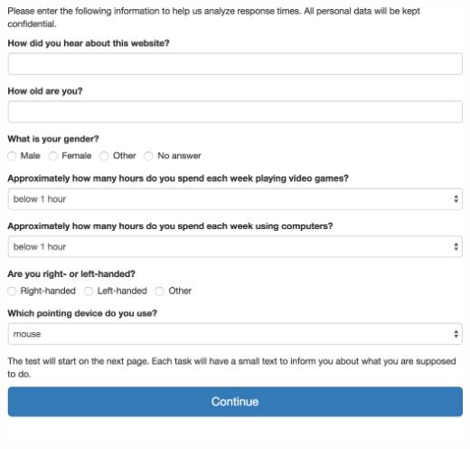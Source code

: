 \begin{appendices}
\begin{minipage}{\textwidth}
\centering
\includegraphics[width=\textwidth]{images/screenshots/ex_step_3_questions}
\label{fig:ex_step_3_questions}
\end{minipage}


\end{appendices}

